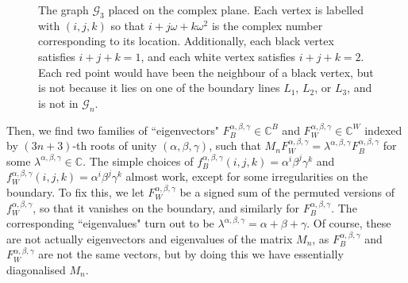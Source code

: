 \documentclass{article}
\begin{document}
\begin{figure}[h]
    \caption{The graph $\mathcal{G}_3$ placed on the complex plane. Each vertex is labelled with $(i,j,k)$ so that $i+j\omega+k\omega^2$ is the complex number corresponding to its location. Additionally, each black vertex satisfies $i+j+k=1$, and each white vertex satisfies $i+j+k=2$. Each red point would have been the neighbour of a black vertex, but is not because it lies on one of the boundary lines $L_1$, $L_2$, or $L_3$, and is not in $\mathcal{G}_n$.}\label{fig:coordinate}
\end{figure}

Then, we find two families of ``eigenvectors" $F^{\alpha,\beta,\gamma}_B\in\mathbb{C}^B$ and $F^{\alpha,\beta,\gamma}_W\in\mathbb{C}^W$ indexed by $(3n+3)$-th roots of unity $(\alpha,\beta,\gamma)$, such that $M_nF^{\alpha,\beta,\gamma}_W=\lambda^{\alpha,\beta,\gamma}F^{\alpha,\beta,\gamma}_B$ for some $\lambda^{\alpha,\beta,\gamma}\in\mathbb{C}$. The simple choices of $f^{\alpha,\beta,\gamma}_B(i,j,k)=\alpha^i\beta^j\gamma^k$ and $f^{\alpha,\beta,\gamma}_W(i,j,k)=\alpha^i\beta^j\gamma^k$ almost work, except for some irregularities on the boundary. To fix this, we let $F^{\alpha,\beta,\gamma}_W$ be a signed sum of the permuted versions of $f^{\alpha,\beta,\gamma}_W$, so that it vanishes on the boundary, and similarly for $F^{\alpha,\beta,\gamma}_B$. The corresponding ``eigenvalues" turn out to be $\lambda^{\alpha,\beta,\gamma}=\alpha+\beta+\gamma$. Of course, these are not actually eigenvectors and eigenvalues of the matrix $M_n$, as $F^{\alpha,\beta,\gamma}_B$ and $F^{\alpha,\beta,\gamma}_W$ are not the same vectors, but by doing this we have essentially diagonalised $M_n$. 
\end{document}
